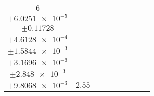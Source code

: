 \documentclass[8pt]{article}
\begin{document}
\begin{longtable}[l]{c c c c c c c c c}
$\num{6}$ & \begin{tabular}[c]{@{}c@{}}$\num{2.9908e-2}$ \\ $\pm\num{6.0251e-5}$\end{tabular} & \begin{tabular}[c]{@{}c@{}}$\num{0.76237}$ \\ $\pm\num{0.11728}$\end{tabular} & \begin{tabular}[c]{@{}c@{}}$\num{8.5021}$ \\ $\pm\num{4.6128e-4}$\end{tabular} & \begin{tabular}[c]{@{}c@{}}$\num{646.17}$ \\ $\pm\num{1.5844e-3}$\end{tabular} & \begin{tabular}[c]{@{}c@{}}$\num{1.2927}$ \\ $\pm\num{3.1696e-6}$\end{tabular} & \begin{tabular}[c]{@{}c@{}}$\num{1.1578}$ \\ $\pm\num{2.848e-3}$\end{tabular} & \begin{tabular}[c]{@{}c@{}}$\num{4.1838}$ \\ $\pm\num{9.8068e-3}$\end{tabular} & $\num{2.55}$\\
\bottomrule
\end{longtable}
\end{document}
